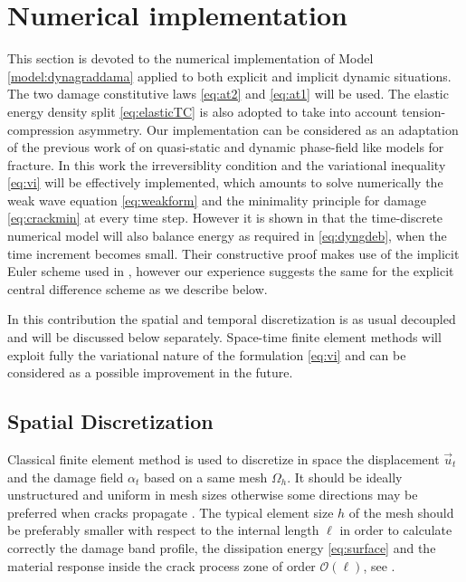 \chapter{Numerical implementation}
\minitoc

This section is devoted to the numerical implementation of Model \ref{model:dynagraddama} applied to both explicit and implicit dynamic situations. The two damage constitutive laws \eqref{eq:at2} and \eqref{eq:at1} will be used. The elastic energy density split \eqref{eq:elasticTC} is also adopted to take into account tension-compression asymmetry. Our implementation can be considered as an adaptation of the previous work of \cite{PhamAmorMarigoMaurini:2011,Bourdin:2011,BordenVerhooselScottHughesLandis:2012} on quasi-static and dynamic phase-field like models for fracture. In this work the irreversiblity condition and the variational inequality \eqref{eq:vi} will be effectively implemented, which amounts to solve numerically the weak wave equation \eqref{eq:weakform} and the minimality principle for damage \eqref{eq:crackmin} at every time step. However it is shown in \cite{LarsenOrtnerSuli:2010} that the time-discrete numerical model will also balance energy as required in \eqref{eq:dyngdeb}, when the time increment becomes small. Their constructive proof makes use of the implicit Euler scheme used in \cite{Bourdin:2011}, however our experience suggests the same for the explicit central difference scheme as we describe below.

In this contribution the spatial and temporal discretization is as usual decoupled and will be discussed below separately. Space-time finite element methods will exploit fully the variational nature of the formulation \eqref{eq:vi} and can be considered as a possible improvement in the future.

\section{Spatial Discretization} \label{sec:spatial}
Classical finite element method is used to discretize in space the displacement $\vec{u}_t$ and the damage field $\alpha_t$ based on a same mesh $\Omega_h$. It should be ideally unstructured and uniform in mesh sizes otherwise some directions may be preferred when cracks propagate \cite{PhamAmorMarigoMaurini:2011}. The typical element size $h$ of the mesh should be preferably smaller with respect to the internal length $\ell$ in order to calculate correctly the damage band profile, the dissipation energy \eqref{eq:surface} and the material response inside the crack process zone of order $\mathcal{O}(\ell)$, see \cite{BourdinFrancfortMarigo:2008}.

